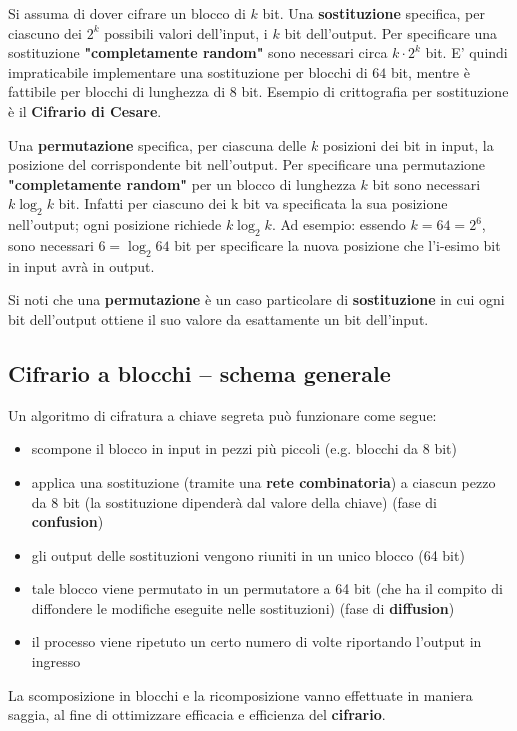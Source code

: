 Si assuma di dover cifrare un blocco di $k$ bit. Una \textbf{sostituzione} specifica, per ciascuno dei $2^k$ possibili valori dell'input, i $k$ bit dell'output. Per specificare una sostituzione \textbf{"completamente random"} sono necessari circa $k \cdot 2^k$ bit. E' quindi impraticabile implementare una sostituzione per blocchi di $64$ bit, mentre è fattibile per blocchi di lunghezza di $8$ bit. Esempio di crittografia per sostituzione è il \textbf{Cifrario di Cesare}.\newline \newline

Una \textbf{permutazione} specifica, per ciascuna delle $k$ posizioni dei bit in input, la posizione del corrispondente bit nell'output. Per specificare una permutazione \textbf{"completamente random"} per un blocco di lunghezza $k$ bit sono necessari $k\log_2 k$ bit. Infatti per ciascuno dei k bit va specificata la sua posizione nell'output; ogni posizione richiede $k\log_2 k$. Ad esempio: essendo $k = 64 = 2^6$, sono necessari $6 = \log_2 {64}$ bit per specificare la nuova posizione che l'i-esimo bit in input avrà in output. \newline \newline

Si noti che una \textbf{permutazione} è un caso particolare di \textbf{sostituzione} in cui ogni bit dell'output ottiene il suo valore da esattamente un bit dell'input.

\subsection{Cifrario a blocchi – schema generale}
Un algoritmo di cifratura a chiave segreta può funzionare come segue:
\begin{itemize}
  \item scompone il blocco in input in pezzi più piccoli (e.g. blocchi da 8 bit)
  \item applica una sostituzione (tramite una \textbf{rete combinatoria}) a ciascun pezzo da 8 bit (la sostituzione dipenderà dal valore della chiave) (fase di \textbf{confusion})
  \item gli output delle sostituzioni vengono riuniti in un unico blocco (64 bit)
  \item tale blocco viene permutato in un permutatore a 64 bit (che ha il compito di diffondere le modifiche eseguite nelle sostituzioni) (fase di \textbf{diffusion})
  \item il processo viene ripetuto un certo numero di volte riportando l'output in ingresso
\end{itemize}
La scomposizione in blocchi e la ricomposizione vanno effettuate in maniera saggia, al fine di ottimizzare efficacia e efficienza del \textbf{cifrario}.
